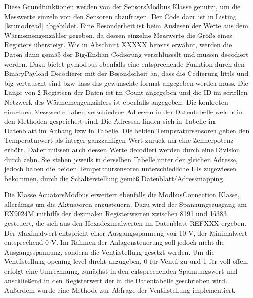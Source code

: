 

Diese Grundfunktionen werden von der SensorsModbus Klasse genutzt, um die Messwerte einzeln von den Sensoren abzufragen. Der Code dazu ist in Listing \ref{lst:modread} abgebildet.
Eine Besonderheit ist beim Auslesen der Werte aus dem Wärmemengenzähler gegeben, da dessen einzelne Messwerte die Größe eines Registers übersteigt. Wie in Abschnitt XXXXX bereits erwähnt, werden die Daten dann gemäß der Big-Endian Codierung verschlüsselt und müssen decodiert werden. Dazu bietet pymodbus ebenfalls eine entsprechende Funktion durch den BinaryPayload Decodierer mit der Besonderheit an, dass die Codierung little und big vertauscht sind bzw dass das gewünschte format angegeben werden muss. Die Länge von 2 Registern der Daten ist im Count angegeben und die ID im seriellen Netzwerk des Wärmemengenzählers ist ebenfalls angegeben. Die konkreten einzelnen Messwerte haben verschiedene Adressen in der Datentabelle welche in den Methoden gespeichert sind.
Die Adressen finden sich in Tabelle im Datenblatt im Anhang bzw in Tabelle.
Die beiden Temperatursensoren geben den Temperaturwert als integer ganzzahligen Wert zurück um eine Zehnerpotenz erhöht. Daher müssen auch dessen Werte decodiert werden durch eine Division durch zehn. Sie stehen jeweils in derselben Tabelle unter der gleichen Adresse, jedoch haben die beiden Temperatursensoren unterschiedliche IDs zugewiesen bekommen, durch die Schalterstellung gemäß Datenblatt/Adressmapping.



Die Klasse AcuatorsModbus erweitert ebenfalls die ModbusConnection Klasse, allerdings um die Aktuatoren anzusteuern. Dazu wird der Spannungsausgang am EX9024M mithilfe der dezimalen Registerwerten zwischen 8191 und 16383 gesteuert, die sich aus den Hexadezimalwerten im Datenblatt REFXXX ergeben. Der Maximalwert entspricht einer Ausgangsspannung von 10 V, der Minimalwert entsprechend 0 V. Im Rahmen der Anlagensteuerung soll jedoch nicht die Ausgangsspannung, sondern die Ventilstellung gesetzt werden. Um die Ventilstellung opening-level direkt anzugeben, 0 für Ventil zu und 1 für voll offen, erfolgt eine Umrechnung, zunächst in den entsprechenden Spannungswert und anschließend in den Registerwert der in die Datentabelle geschrieben wird. Außerdem wurde eine Methode zur Abfrage der Ventilstellung implementiert.

